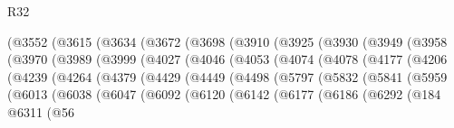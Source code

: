 \begin{lexlean}{R32}
\begin{coremodule}
                (@3552
                  (@3615
                    (@3634
                      (@3672
                        (@3698
                          (@3910
                            (@3925
                              (@3930
                                (@3949
                                  (@3958
                                    (@3970
                                      (@3989
                                        (@3999
                                          (@4027
                                            (@4046
                                              (@4053
                                                (@4074
                                                  (@4078
                                                    (@4177
                                                      (@4206
                                                        (@4239
                                                          (@4264
                                                            (@4379
                                                              (@4429
                                                                (@4449
                                                                  (@4498
                                                                    (@5797
                                                                      (@5832
                                                                        (@5841
                                                                          (@5959
                                                                            (@6013
                                                                              (@6038
                                                                                (@6047
                                                                                  (@6092
                                                                                    (@6120
                                                                                      (@6142
                                                                                        (@6177
                                                                                          (@6186
                                                                                            (@6292
                                                                                              (@184
                                                                                                @6311
                                                                                                (@56

\end{coremodule}
\end{lexlean}
